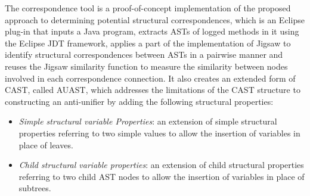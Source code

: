 
The correspondence tool is a proof-of-concept implementation of the proposed approach to determining potential structural correspondences, which is an Eclipse plug-in that inputs a Java program, extracts ASTs of logged methods in it using the Eclipse JDT framework, applies a part of the implementation of Jigsaw to identify structural correspondences between ASTs in a pairwise manner and reuses the Jigsaw similarity function to measure the similarity between nodes involved in each correspondence connection. It also creates an extended form of CAST, called AUAST, which  addresses the limitations of the CAST structure to constructing an anti-unifier by adding the following structural properties:

\begin{itemize} [leftmargin=.5in]
\item \textit{Simple structural variable Properties}: an extension of simple structural properties referring to two simple values to allow the insertion of variables in place of leaves.
\end{itemize}
\begin{itemize} [leftmargin=.5in]
\item \textit{Child structural variable properties}: an extension of child structural properties referring to two child AST nodes to allow the insertion of variables in place of subtrees.
\end{itemize}






